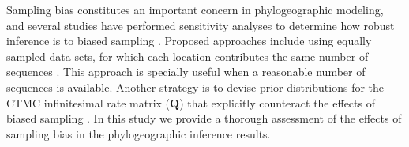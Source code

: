 \documentclass[a4paper,10pt]{article}
\begin{document}
Sampling bias constitutes an important concern in phylogeographic modeling, and several studies have performed sensitivity analyses to determine how robust inference is to biased sampling \cite{M-Faria2012,M-Lemey2014,M-polar,M-fluPNAS}.
Proposed approaches include using equally sampled data sets, for which each location contributes the same number of sequences \cite{M-fluPNAS}.
This approach is specially useful when a reasonable number of sequences is available.
Another strategy is to devise prior distributions for the CTMC infinitesimal rate matrix ($\mathbf{Q}$) that explicitly counteract the effects of biased sampling \cite{M-Faria2012}.
In this study we provide a thorough assessment of the effects of sampling bias in the phylogeographic inference results. 
% 
\end{document}

